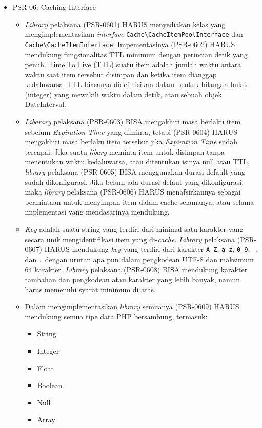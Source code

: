 \documentclass[a4paper,twoside]{article}
\begin{document}
\begin{enumerate}
\begin{enumerate}
\begin{itemize}
				\item PSR-06: Caching Interface
				\begin{itemize}
					\item \textit{Library} pelaksana (PSR-0601) HARUS menyediakan kelas yang mengimplementasikan \textit{interface} \verb|Cache\CacheItemPoolInterface| dan \verb|Cache\CacheItemInterface|. Impementasinya (PSR-0602) HARUS mendukung fungsionalitas TTL minimum dengan perincian detik yang penuh. Time To Live (TTL) suatu item adalah jumlah waktu antara waktu saat item tersebut disimpan dan ketika item dianggap kedaluwarsa. TTL biasanya didefinisikan dalam bentuk bilangan bulat (integer) yang mewakili waktu dalam detik, atau sebuah objek DateInterval.
					\item \textit{Libarary} pelaksana (PSR-0603) BISA mengakhiri masa berlaku item sebelum \textit{Expiration Time} yang diminta, tetapi (PSR-0604) HARUS mengakhiri masa berlaku item tersebut jika \textit{Expiration Time} sudah tercapai. Jika suatu \textit{libary} meminta item untuk disimpan tanpa menentukan waktu kedaluwarsa, atau ditentukan isinya null atau TTL,  \textit{library} pelaksana (PSR-0605) BISA menggunakan durasi default yang sudah dikonfigurasi. Jika belum ada durasi defaut yang dikonfigurasi, maka \textit{library} pelaksana (PSR-0606) HARUS menafsirkannya sebagai permintaan untuk menyimpan item dalam cache selamanya, atau selama implementasi yang mendasarinya mendukung.
					\item \textit{Key} adalah suatu string yang terdiri dari minimal satu karakter yang secara unik mengidentifikasi item yang di-\textit{cache}. \textit{Library} pelaksana (PSR-0607) HARUS mendukung \textit{key} yang terdiri dari karakter \verb|A-Z|, \verb|a-z|, \verb|0-9|, \verb|_|, dan \verb|.| dengan urutan apa pun dalam pengkodean UTF-8 dan maksimum 64 karakter. \textit{Library} pelaksana (PSR-0608) BISA mendukung karakter tambahan dan pengkodean atau karakter yang lebih banyak, namun harus memenuhi syarat minimum di atas.
					\item Dalam mengimplementasikan \textit{library} semuanya (PSR-0609) HARUS mendukung semua tipe data PHP bersambung, termasuk: 
					\begin{itemize}
						\item String
						\item Integer
						\item Float
						\item Boolean
						\item Null
						\item Array

\end{itemize}
\end{itemize}
\end{itemize}
\end{enumerate}
\end{enumerate}
\end{document}
